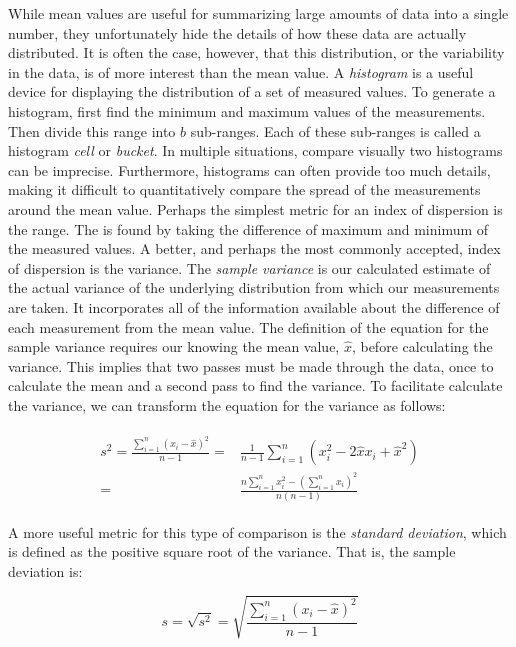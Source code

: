 \documentclass[openany, a4paper]{book}
\theoremstyle{break}
\theoremstyle{example}
\theoremstyle{note}
\theoremstyle{break}
\theoremstyle{exercise}
\begin{document}
While mean values are useful for summarizing large amounts of data into a
single number, they unfortunately hide the details of how these data are
actually distributed. It is often the case, however, that this distribution,
or the variability in the data, is of more interest than the mean value. A
\emph{histogram} is a useful device for displaying the distribution of a set of
measured values. To generate a histogram, first find the minimum and maximum
values of the measurements. Then divide this range into \(b\)
sub-ranges. Each of these sub-ranges is called a histogram \emph{cell} or \emph{bucket}. In
multiple situations, compare visually two histograms can be
imprecise. Furthermore, histograms can often provide too much details, making
it difficult to quantitatively compare the spread of the measurements around
the mean value. Perhaps the simplest metric for an index of dispersion is the
range. The is found by taking the difference of maximum and minimum of the
measured values. A better, and perhaps the most commonly accepted, index of
dispersion is the variance. The \emph{sample variance} is our calculated estimate of
the actual variance of the underlying distribution from which our
measurements are taken. It incorporates all of the information available
about the difference of each measurement from the mean value. The definition
of the equation for the sample variance requires our knowing the mean value,
\(\hat{x}\), before calculating the variance. This implies that two passes
must be made through the data, once to calculate the mean and a second pass
to find the variance. To facilitate calculate the variance, we can transform
the equation for the variance as follows:

\begin{align}
\begin{split}
  s^2 = \frac{\sum^n_{i = 1}(x_i - \hat{x})^2}{n - 1} = & \frac{1}{n - 1}\sum^n_{i = 1}(x_i^2-2\hat{x}x_i + \hat{x}^2)\\
  = & \frac{n\sum^n_{i = 1}x_i^2 - (\sum^n_{i = 1}x_i)^2}{n(n-1)}
\end{split}
\end{align}

A more useful metric for this type of comparison is the \emph{standard deviation},
which is defined as the positive square root of the variance. That is, the
sample deviation is:

\begin{equation}
  s = \sqrt{s^2} = \sqrt{\frac{\sum_{i=1}^n (x_i - \hat{x})^2}{n - 1}}
\end{equation}
\end{document}
